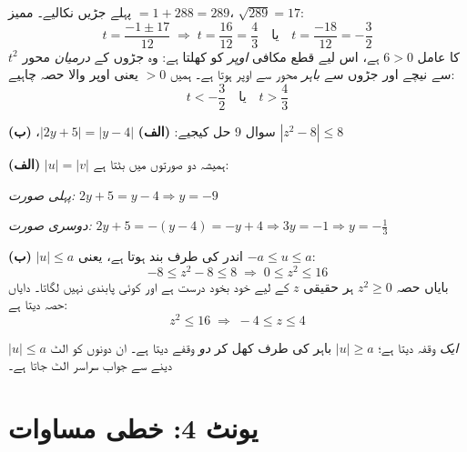 \begin{hal}
پہلے جڑیں نکالیے۔ ممیز \(=1+288=289\)، \(\sqrt{289}=17\):
\[
t=\frac{-1\pm 17}{12} \;\Longrightarrow\;
t=\frac{16}{12}=\frac43 \quad\text{یا}\quad t=\frac{-18}{12}=-\frac32
\]
\(t^{2}\) کا عامل \(6>0\) ہے، اس لیے قطع مکافی \emph{اوپر} کو کھلتا ہے: وہ
جڑوں کے \emph{درمیان} محور سے نیچے اور جڑوں سے \emph{باہر} محور سے اوپر ہوتا
ہے۔ ہمیں \(>0\) یعنی اوپر والا حصہ چاہیے:
\[
t<-\frac32 \quad\text{یا}\quad t>\frac43
\]

\end{hal}

\begin{sawal}{سوال \textenglish{9}}
حل کیجیے: \textbf{(الف)} \(|2y+5|=|y-4|\)، \quad
\textbf{(ب)} \(|z^{2}-8|\le 8\)
\end{sawal}

\begin{hal}
\textbf{(الف)} \(|u|=|v|\) ہمیشہ دو صورتوں میں بٹتا ہے:

\emph{پہلی صورت:} \(2y+5=y-4 \Rightarrow y=-9\)

\emph{دوسری صورت:} \(2y+5=-(y-4)=-y+4 \Rightarrow 3y=-1 \Rightarrow
y=-\tfrac13\)


\medskip
\textbf{(ب)} \(|u|\le a\) اندر کی طرف بند ہوتا ہے، یعنی \(-a\le u\le a\):
\[
-8\le z^{2}-8\le 8 \;\Longrightarrow\; 0\le z^{2}\le 16
\]
بایاں حصہ \(z^{2}\ge0\) ہر حقیقی \(z\) کے لیے خود بخود درست ہے اور کوئی پابندی
نہیں لگاتا۔ دایاں حصہ دیتا ہے:
\[
z^{2}\le 16 \;\Longrightarrow\; -4\le z\le 4
\]

\end{hal}

\begin{ghalti}
\(|u|\le a\) \emph{ایک} وقفہ دیتا ہے؛ \(|u|\ge a\) باہر کی طرف کھل کر
\emph{دو} وقفے دیتا ہے۔ ان دونوں کو الٹ دینے سے جواب سراسر الٹ جاتا ہے۔
\end{ghalti}

\section*{یونٹ \textenglish{4}: خطی مساوات}

